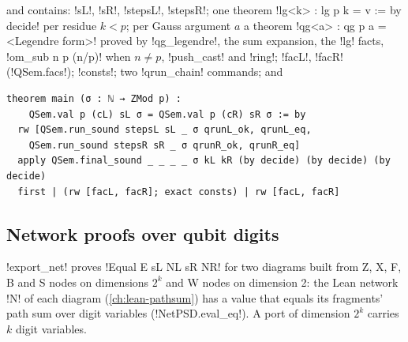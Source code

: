 {{{and contains: \lexlean!sL!, \lexlean!sR!, \lexlean!stepsL!, \lexlean!stepsR!; one theorem
\lexlean!lg<k> : lg p k = v := by decide! per residue $k<p$; per Gauss argument $a$ a theorem
\lexlean!qg<a> : qg p a = <Legendre form>! proved by \lexlean!qg_legendre!, the sum expansion, the
\lexlean!lg! facts, \lexlean!om_sub n p (n/p)! when $n\neq p$, \lexlean!push_cast! and \lexlean!ring!;
\lexlean!facL!, \lexlean!facR! (\lexlean!QSem.facs!); \lexlean!consts!; two \lexlean!qrun_chain! commands; and
\begin{lstlisting}[style=lexlean]
theorem main (σ : ℕ → ZMod p) :
    QSem.val p (cL) sL σ = QSem.val p (cR) sR σ := by
  rw [QSem.run_sound stepsL sL _ σ qrunL_ok, qrunL_eq,
    QSem.run_sound stepsR sR _ σ qrunR_ok, qrunR_eq]
  apply QSem.final_sound _ _ _ _ σ kL kR (by decide) (by decide) (by decide)
  first | (rw [facL, facR]; exact consts) | rw [facL, facR]
\end{lstlisting}

\subsection{Network proofs over qubit digits}\label{sec:lean-export-net}

\lexpy!export_net! proves \lexlean!Equal E sL NL sR NR! for two diagrams built from Z, X, F, B and S
nodes on dimensions $2^{k}$ and W nodes on dimension 2: the Lean network \lexlean!N! of each
diagram (\cref{ch:lean-pathsum}) has a value that equals its fragments' path sum over digit
variables (\lexlean!NetPSD.eval_eq!). A port of dimension $2^{k}$ carries $k$ digit variables.

}}}
